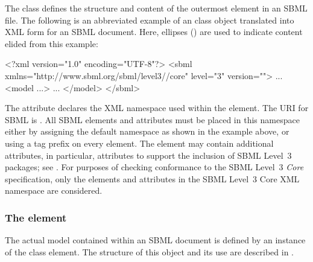 The \SBML class defines the structure and content of the
 outermost element in an SBML file.  The following is
an abbreviated example of an \SBML class object translated into
XML form for an SBML \thisLV document. Here,
ellipses () are used to indicate content elided from this example:

\begin{example}
<?xml version="1.0" encoding="UTF-8"?>
<sbml xmlns="http://www.sbml.org/sbml/level3/\thisvlc/core" level="3" version="\sbmlversionnum">
  ...
  <model ...>    ...
  </model>
</sbml>
\end{example}

The attribute  declares the XML namespace used within
the  element.  The URI for SBML \thisLV is
.  All SBML
\thisLV elements and attributes must be placed in this namespace
either by assigning the default namespace as shown in the example
above, or using a tag prefix on every element.  The 
element may contain additional attributes, in particular,
attributes to support the inclusion of SBML Level~3 packages; see
.  For purposes of checking
conformance to the SBML Level~3 \emph{Core} specification, only
the elements and attributes in the SBML Level~3 Core XML namespace
are considered.




\subsubsection{The  element}

The actual model contained within an SBML document is defined by
an instance of the \Model class element.  The structure of this
object and its use are described in .


